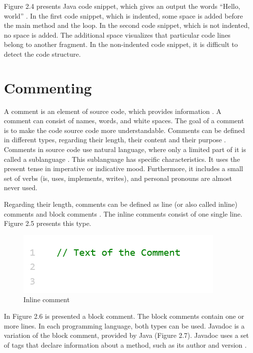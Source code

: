 Figure 2.4 presents Java code snippet, which gives an output the words “Hello, world”  \cite{hanenberg2024indentation}.
In the first code snippet, which is indented, some space is added before the main method and the loop.  In the second code snippet, which is not indented, no space is added. The additional space visualizes that particular code lines belong to another fragment. In the non-indented code snippet, it is difficult to detect the code structure. 
 





\section{Commenting}
A comment is an element of source code, which provides information \cite{de2011comment}. A comment can consist of names, words, and white spaces.  The goal of a comment is to make the code source code more understandable.  Comments can be defined in different types, regarding their length, their content and their purpose \cite{de2011comment} \cite{de2017investigating}. Comments in source code use natural language, where only a limited part of it is called a sublanguage \cite{de2017investigating}. This sublanguage has specific characteristics. It uses the present tense in imperative or indicative mood. Furthermore, it includes a small set of verbs (is, uses, implements, writes), and personal pronouns are almost never used.

Regarding their length, comments can be defined as line (or also called inline) comments and block comments \cite{de2017investigating}. The inline comments consist of one single line. Figure 2.5 presents this type. 

\begin{figure} [H]
  \centering
  \includegraphics [scale=1]
  {figures/inline.png}
  \caption{Inline comment 
  \cite{de2011comment}}
  \label{fig:AnhangsChor}
\end{figure}

In Figure 2.6 is presented a block comment. The block comments contain one or more lines. In each programming language, both types can be used. Javadoc is a variation of the block comment, provided by Java (Figure 2.7).  Javadoc uses a set of tags that declare information about a method, such as its author and version \cite{de2011comment}.

